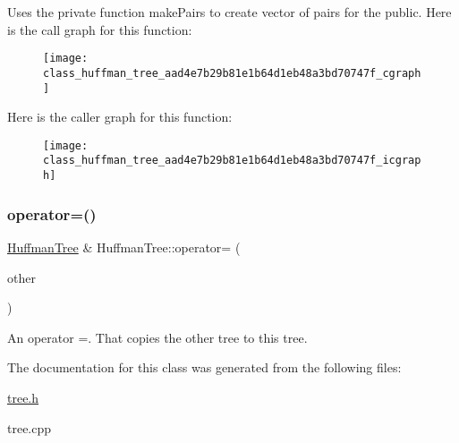 Uses the private function make\+Pairs to create vector of pairs for the public. Here is the call graph for this function\+:\nopagebreak
\begin{figure}[H]
\begin{center}
\leavevmode
\texttt{[image: class\_huffman\_tree\_aad4e7b29b81e1b64d1eb48a3bd70747f\_cgraph]}
\end{center}
\end{figure}
Here is the caller graph for this function\+:\nopagebreak
\begin{figure}[H]
\begin{center}
\leavevmode
\texttt{[image: class\_huffman\_tree\_aad4e7b29b81e1b64d1eb48a3bd70747f\_icgraph]}
\end{center}
\end{figure}
\mbox{\label{class_huffman_tree_a1274cfce54e9bb66af77bff91aa71411}} 
\subsubsection{\texorpdfstring{operator=()}{operator=()}}
{\footnotesize\ttfamily \hyperlink{class_huffman_tree}{Huffman\+Tree} \& Huffman\+Tree\+::operator= (\begin{DoxyParamCaption}\item[{const \hyperlink{class_huffman_tree}{Huffman\+Tree} \&}]{other }\end{DoxyParamCaption})}

An operator =. That copies the \textquotesingle{}other\textquotesingle{} tree to \textquotesingle{}this\textquotesingle{} tree. 

The documentation for this class was generated from the following files\+:\begin{DoxyCompactItemize}
\item 
\hyperlink{tree_8h}{tree.\+h}\item 
tree.\+cpp\end{DoxyCompactItemize}
